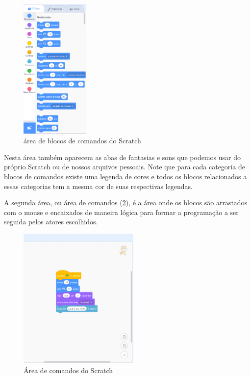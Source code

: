 \documentclass[12pt, openright, a4paper, brazil, openany, oneside]{abntex2}
\begin{document}
\begin{figure}[h]

    \center

    \includegraphics[height=7cm]{scratch2.png}
    \caption{área de blocos de comandos do Scratch \label{scr2}}
    
\end{figure}

Nesta área também aparecem as abas de fantasias e sons que podemos usar do próprio Scratch ou de nossos arquivos pessoais. Note que para cada categoria de blocos de comandos existe uma legenda de cores e todos os blocos relacionados a essas categorias tem a mesma cor de suas respectivas legendas.

A segunda área, ou área de comandos (\ref{scr3}), é a área onde os blocos são arrastados com o mouse e encaixados de maneira lógica para formar a programação a ser seguida pelos atores escolhidos.

\begin{figure}[h]

    \center

    \includegraphics[height=7cm]{scratch3.png}
    \caption{Área de comandos do Scratch \label{scr3}}
    
\end{figure}
\end{document}
